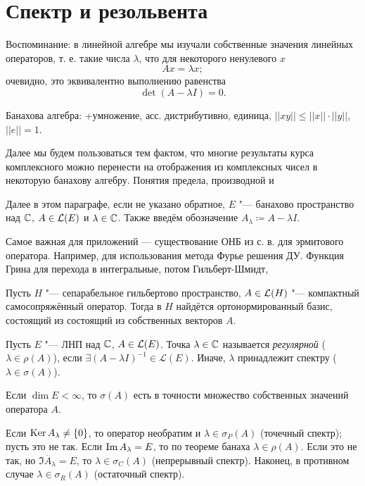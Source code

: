 \documentclass[main]{subfiles}
\begin{document}
\section{Спектр и резольвента} %
Воспоминание: в линейной алгебре
мы изучали собственные значения линейных операторов,
т. е. такие числа \( \lambda \),
что для некоторого ненулевого \( x \)
\[ Ax = \lambda x; \]
очевидно, это эквивалентно выполнению равенства
\[ \det (A - \lambda I) = 0. \]


Банахова алгебра: +умножение, асс. дистрибутивно, единица,
\( ||xy|| \le ||x|| \cdot ||y|| \), \( ||e|| = 1 \).

Далее мы будем пользоваться тем фактом, что многие результаты
курса комплексного можно перенести на отображения из
комплексных чисел в некоторую банахову алгебру.
Понятия предела, производной и

Далее в этом параграфе,
если не указано обратное,
\( E \) "--- банахово пространство над \( \mathbb{C} \),
$A \in \Linears{E}$ и $\lambda \in \mathbb{C}$.
Также введём обозначение $A_\lambda \coloneqq A - \lambda I$.

Самое важная для приложений — существование
ОНБ из с. в. для эрмитового оператора.
Например, для использования метода Фурье решения ДУ.
Функция Грина для перехода в интегральные, потом Гильберт-Шмидт,

\begin{theorem*}
  Пусть \( H \) "--- сепарабельное гильбертово пространство,
  \( A \in \Linears{H} \) "--- компактный самосопряжённый оператор.
  Тогда в \( H \) найдётся ортонормированный базис,
  состоящий из состоящий из собственных векторов \( A \).
\end{theorem*}

\begin{definition}
  Пусть \( E \) "--- ЛНП над \( \mathbb{C} \),
  \( A \in \Linears{E} \).
  Точка \( \lambda \in \mathbb{C} \) называется \emph{регулярной}
  ($\lambda \in \rho(A)$), если
  $\exists (A - \lambda I)^{-1} \in \mathcal{L}(E)$.
  Иначе, $\lambda$ принадлежит спектру ($\lambda \in \sigma(A)$).
\end{definition}

\begin{example}
  Если $\dim E < \infty$, то $\sigma(A)$ есть в точности
  множество собственных значений оператора $A$.
\end{example}

Если $\operatorname{Ker} A_\lambda \ne \{ 0 \}$, то оператор необратим
и $\lambda \in \sigma_P(A)$ (точечный спектр); пусть это не так.
Если $\operatorname{Im} A_\lambda = E$, то по теореме банаха $\lambda \in \rho(A)$.
Если это не так, но $\overline{\Im A_\lambda} = E$, то $\lambda \in
\sigma_C(A)$ (непрерывный спектр). Наконец, в противном случае
$\lambda \in \sigma_R(A)$ (остаточный спектр).
\end{document}
